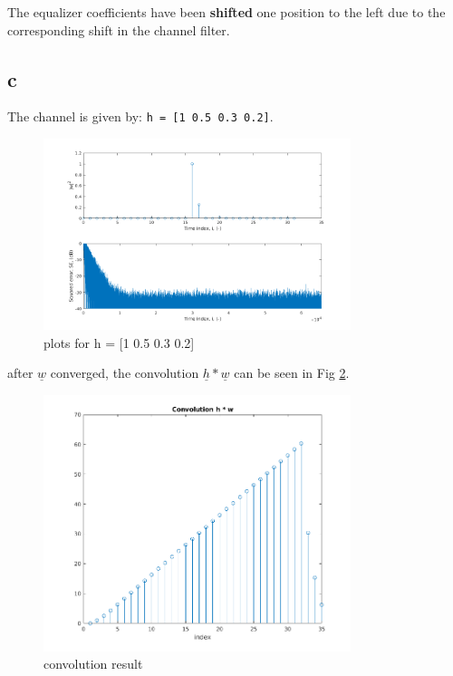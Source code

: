 \documentclass[12pt,letterpaper]{article}
\begin{document}
The equalizer coefficients have been \textbf{shifted} one position to the left due to the corresponding shift 
in the channel filter.

\subsection{c}
The channel is given by: \texttt{h = [1 0.5 0.3 0.2]}.

\begin{figure}[!h] 
  \centering
  \includegraphics[width=0.8\textwidth]{../matlab/img/f3.png}
  \caption{plots for h = [1 0.5 0.3 0.2]}
  \label{fig:f3}
\end{figure}

after $\underline{w}$ converged, the convolution $\underline{h}*\underline{w}$ can be seen in Fig \ref{fig:conv}.

\begin{figure}[!h] 
  \centering
  \includegraphics[width=0.8\textwidth]{../matlab/img/conv.png}
  \caption{convolution result}
  \label{fig:conv}
\end{figure}
\end{document}
